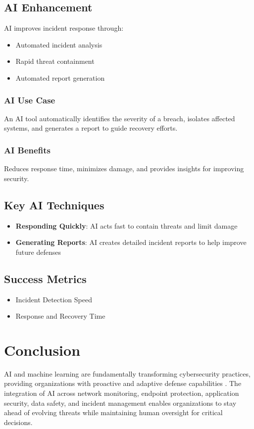 \documentclass[10pt,a4paper]{article}
\begin{document}
\subsection{AI Enhancement}
AI improves incident response through:
\begin{itemize}\itemsep0.5em
    \item Automated incident analysis
    \item Rapid threat containment
    \item Automated report generation
\end{itemize}

\subsubsection{AI Use Case}
An AI tool automatically identifies the severity of a breach, isolates affected systems, and generates a report to guide recovery efforts.

\subsubsection{AI Benefits}
Reduces response time, minimizes damage, and provides insights for improving security.

\subsection{Key AI Techniques}
\begin{itemize}\itemsep0.5em
    \item \textbf{Responding Quickly}: AI acts fast to contain threats and limit damage
    \item \textbf{Generating Reports}: AI creates detailed incident reports to help improve future defenses
\end{itemize}

\subsection{Success Metrics}
\begin{itemize}\itemsep0.5em
    \item Incident Detection Speed
    \item Response and Recovery Time
\end{itemize}

\section{Conclusion}
AI and machine learning are fundamentally transforming cybersecurity practices, providing organizations with proactive and adaptive defense capabilities \cite{sarker2024}. The integration of AI across network monitoring, endpoint protection, application security, data safety, and incident management enables organizations to stay ahead of evolving threats while maintaining human oversight for critical decisions.
\end{document}
